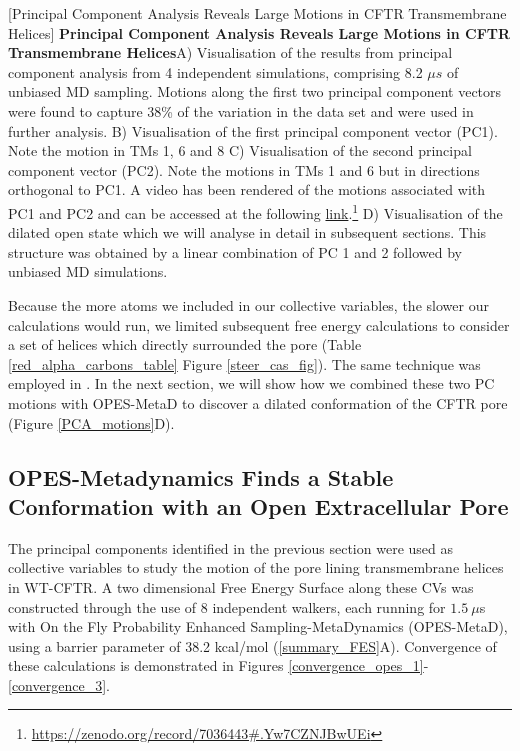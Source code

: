 	[Principal Component Analysis Reveals Large Motions in CFTR Transmembrane Helices] {\textbf{Principal Component Analysis Reveals Large Motions in CFTR Transmembrane Helices}}{A) Visualisation of the results from principal component analysis from 4 independent simulations, comprising 8.2 $\mu s$ of unbiased MD sampling. Motions along the first two principal component vectors were found to capture 38\% of the variation in the data set and were used in further analysis. B) Visualisation of the first principal component vector (PC1). Note the motion in TMs 1, 6 and 8 C) Visualisation of the second principal component vector (PC2). Note the motions in TMs 1 and 6 but in directions orthogonal to PC1. A video has been rendered of the motions associated with PC1 and PC2 and can be accessed at the following \href{https://zenodo.org/record/7036443#.Yw7CZNJBwUE}{link}.\footnote{\href{https://zenodo.org/record/7036443\#.Yw7CZNJBwUEi}{https://zenodo.org/record/7036443\#.Yw7CZNJBwUEi}} D) Visualisation of the dilated open state which we will analyse in detail in subsequent sections. This structure was obtained by a linear combination of PC 1 and 2 followed by unbiased MD simulations. } 
	\label{PCA_motions}
	\endgroup

	Because the more atoms we included in our collective variables, the slower our calculations would run, we limited subsequent free energy calculations to consider a set of helices which directly surrounded the pore (Table \ref{red_alpha_carbons_table} Figure \ref{steer_cas_fig}). The same technique was employed in \cite{hoffmann2018}. In the next section, we will show how we combined these two PC motions with OPES-MetaD to discover a dilated conformation of the CFTR pore (Figure \ref{PCA_motions}D). 

\subsection{OPES-Metadynamics Finds a Stable Conformation with an Open Extracellular Pore}

The principal components identified in the previous section were used as collective variables to study the motion of the pore lining transmembrane helices in WT-CFTR. A two dimensional Free Energy Surface along these CVs was constructed through the use of 8 independent walkers, each running for $1.5~\mu$s with On the Fly Probability Enhanced Sampling-MetaDynamics (OPES-MetaD), using a barrier parameter of 38.2 kcal/mol (\ref{summary_FES}A). Convergence of these calculations is demonstrated in Figures \ref{convergence_opes_1}-\ref{convergence_3}. 

